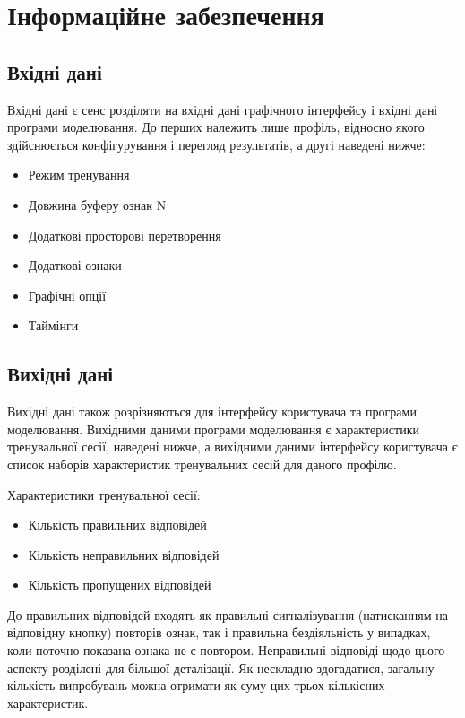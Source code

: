 \section{Інформаційне забезпечення}
\subsection{Вхідні дані}

Вхідні дані є сенс розділяти на вхідні дані графічного інтерфейсу і вхідні дані програми моделювання. До перших належить лише профіль, відносно якого здійснюється конфігурування і перегляд результатів, а другі наведені нижче:

\begin{itemize}
  \item Режим тренування
  \item Довжина буферу ознак N
  \item Додаткові просторові перетворення
  \item Додаткові ознаки
  \item Графічні опції
  \item Таймінги
\end{itemize}

\subsection{Вихідні дані}

Вихідні дані також розрізняються для інтерфейсу користувача та програми моделювання. Вихідними даними програми моделювання є характеристики тренувальної сесії, наведені нижче, а вихідними даними інтерфейсу користувача є список наборів характеристик тренувальних сесій для даного профілю.

Характеристики тренувальної сесії:
\begin{itemize}
  \item Кількість правильних відповідей
  \item Кількість неправильних відповідей
  \item Кількість пропущених відповідей
\end{itemize}

До правильних відповідей входять як правильні сигналізування (натисканням на відповідну кнопку) повторів ознак, так і правильна бездіяльність у випадках, коли поточно-показана ознака не є повтором. Неправильні відповіді щодо цього аспекту розділені для більшої деталізації. Як нескладно здогадатися, загальну кількість випробувань можна отримати як суму цих трьох кількісних характеристик.

